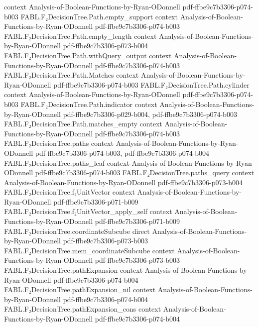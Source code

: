 \begin{theorem}
  {context}
  {Analysis-of-Boolean-Functions-by-Ryan-ODonnell}
  {pdf-ffbe9c7b3306-p074-b003}
\proofstep
  {FABL.F₂DecisionTree.Path.empty_support}
  {context}
  {Analysis-of-Boolean-Functions-by-Ryan-ODonnell}
  {pdf-ffbe9c7b3306-p074-b003}
\proofstep
  {FABL.F₂DecisionTree.Path.empty_length}
  {context}
  {Analysis-of-Boolean-Functions-by-Ryan-ODonnell}
  {pdf-ffbe9c7b3306-p073-b004}
\proofstep
  {FABL.F₂DecisionTree.Path.withQuery_output}
  {context}
  {Analysis-of-Boolean-Functions-by-Ryan-ODonnell}
  {pdf-ffbe9c7b3306-p074-b003}
\proofstep
  {FABL.F₂DecisionTree.Path.Matches}
  {context}
  {Analysis-of-Boolean-Functions-by-Ryan-ODonnell}
  {pdf-ffbe9c7b3306-p074-b003}
\proofstep
  {FABL.F₂DecisionTree.Path.cylinder}
  {context}
  {Analysis-of-Boolean-Functions-by-Ryan-ODonnell}
  {pdf-ffbe9c7b3306-p074-b003}
\proofstep
  {FABL.F₂DecisionTree.Path.indicator}
  {context}
  {Analysis-of-Boolean-Functions-by-Ryan-ODonnell}
  {pdf-ffbe9c7b3306-p029-b004,
    pdf-ffbe9c7b3306-p074-b003}
\proofstep
  {FABL.F₂DecisionTree.Path.matches_empty}
  {context}
  {Analysis-of-Boolean-Functions-by-Ryan-ODonnell}
  {pdf-ffbe9c7b3306-p074-b003}
\proofstep
  {FABL.F₂DecisionTree.paths}
  {context}
  {Analysis-of-Boolean-Functions-by-Ryan-ODonnell}
  {pdf-ffbe9c7b3306-p074-b003,
    pdf-ffbe9c7b3306-p074-b004}
\proofstep
  {FABL.F₂DecisionTree.paths_leaf}
  {context}
  {Analysis-of-Boolean-Functions-by-Ryan-ODonnell}
  {pdf-ffbe9c7b3306-p074-b003}
\proofstep
  {FABL.F₂DecisionTree.paths_query}
  {context}
  {Analysis-of-Boolean-Functions-by-Ryan-ODonnell}
  {pdf-ffbe9c7b3306-p073-b004}
\proofstep
  {FABL.F₂DecisionTree.f₂UnitVector}
  {context}
  {Analysis-of-Boolean-Functions-by-Ryan-ODonnell}
  {pdf-ffbe9c7b3306-p071-b009}
\proofstep
  {FABL.F₂DecisionTree.f₂UnitVector_apply_self}
  {context}
  {Analysis-of-Boolean-Functions-by-Ryan-ODonnell}
  {pdf-ffbe9c7b3306-p071-b009}
\proofstep
  {FABL.F₂DecisionTree.coordinateSubcube}
  {direct}
  {Analysis-of-Boolean-Functions-by-Ryan-ODonnell}
  {pdf-ffbe9c7b3306-p073-b003}
\proofstep
  {FABL.F₂DecisionTree.mem_coordinateSubcube}
  {context}
  {Analysis-of-Boolean-Functions-by-Ryan-ODonnell}
  {pdf-ffbe9c7b3306-p073-b003}
\proofstep
  {FABL.F₂DecisionTree.pathExpansion}
  {context}
  {Analysis-of-Boolean-Functions-by-Ryan-ODonnell}
  {pdf-ffbe9c7b3306-p074-b004}
\proofstep
  {FABL.F₂DecisionTree.pathExpansion_nil}
  {context}
  {Analysis-of-Boolean-Functions-by-Ryan-ODonnell}
  {pdf-ffbe9c7b3306-p074-b004}
\proofstep
  {FABL.F₂DecisionTree.pathExpansion_cons}
  {context}
  {Analysis-of-Boolean-Functions-by-Ryan-ODonnell}
  {pdf-ffbe9c7b3306-p074-b004}

\end{theorem}
